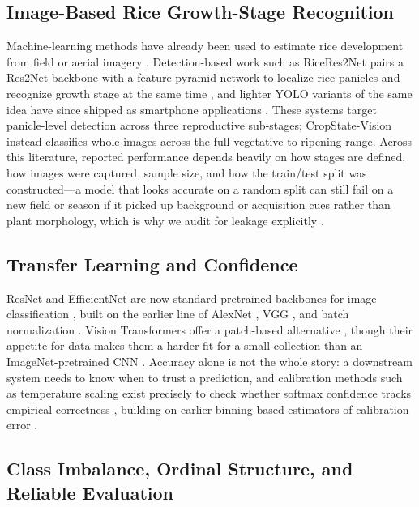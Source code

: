 \documentclass[conference]{IEEEtran}
\begin{document}
\subsection{Image-Based Rice Growth-Stage Recognition}

Machine-learning methods have already been used to estimate rice development from field or aerial imagery \cite{tan2022machine}. Detection-based work such as RiceRes2Net pairs a Res2Net backbone with a feature pyramid network to localize rice panicles and recognize growth stage at the same time \cite{tan2023ricepanicle}, and lighter YOLO variants of the same idea have since shipped as smartphone applications \cite{zheng2025android}. These systems target panicle-level detection across three reproductive sub-stages; CropState-Vision instead classifies whole images across the full vegetative-to-ripening range. Across this literature, reported performance depends heavily on how stages are defined, how images were captured, sample size, and how the train/test split was constructed---a model that looks accurate on a random split can still fail on a new field or season if it picked up background or acquisition cues rather than plant morphology, which is why we audit for leakage explicitly \cite{kapoor2023leakage}.

\subsection{Transfer Learning and Confidence}

ResNet and EfficientNet are now standard pretrained backbones for image classification \cite{he2016deep,tan2019efficientnet}, built on the earlier line of AlexNet \cite{krizhevsky2012alexnet}, VGG \cite{simonyan2015vgg}, and batch normalization \cite{ioffe2015batchnorm}. Vision Transformers offer a patch-based alternative \cite{dosovitskiy2021vit}, though their appetite for data makes them a harder fit for a small collection than an ImageNet-pretrained CNN \cite{deng2009imagenet,pan2010survey}. Accuracy alone is not the whole story: a downstream system needs to know when to trust a prediction, and calibration methods such as temperature scaling exist precisely to check whether softmax confidence tracks empirical correctness \cite{guo2017calibration}, building on earlier binning-based estimators of calibration error \cite{naeini2015calibration}.

\subsection{Class Imbalance, Ordinal Structure, and Reliable Evaluation}
\end{document}
